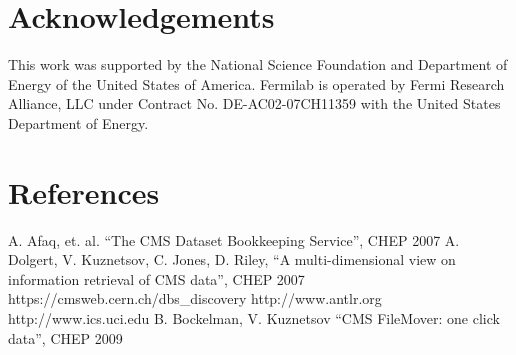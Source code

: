 \documentclass[a4paper]{jpconf}
\begin{document}
\section{Acknowledgements}

This work was supported by the National Science Foundation and Department of Energy of the United States of America. Fermilab is operated by Fermi Research Alliance, LLC under Contract
No. DE-AC02-07CH11359 with the United States Department of Energy.

\section*{References}
\begin{thebibliography}{9}
 A. Afaq, et. al. ``The CMS Dataset Bookkeeping Service'', CHEP 2007 
 A. Dolgert, V. Kuznetsov, C. Jones, D. Riley, 
``A multi-dimensional view on information retrieval of CMS data'', CHEP 2007
 https://cmsweb.cern.ch/dbs\_discovery
 http://www.antlr.org
 http://www.ics.uci.edu
 B. Bockelman, V. Kuznetsov ``CMS FileMover: one click data'', CHEP 2009

\end{thebibliography}
\end{document}
